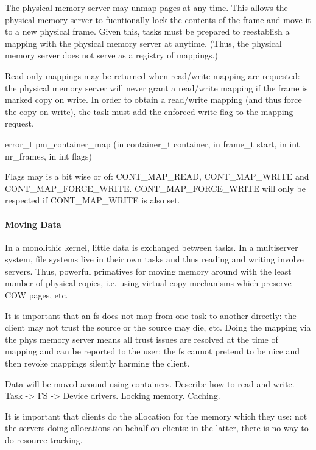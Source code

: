 The physical memory server may unmap pages at any time.  This allows
the physical memory server to fucntionally lock the contents of the
frame and move it to a new physical frame.  Given this, tasks must be
prepared to reestablish a mapping with the physical memory server at
anytime.  (Thus, the physical memory server does not serve as a
registry of mappings.)

Read-only mappings may be returned when read/write mapping are
requested: the physical memory server will never grant a read/write
mapping if the frame is marked copy on write.  In order to obtain a
read/write mapping (and thus force the copy on write), the task must
add the enforced write flag to the mapping request.

\begin{code}
error\_t pm\_container\_map (in container\_t container, in frame\_t
start, in int nr\_frames, in int flags)
\end{code}

\noindent
Flags may is a bit wise or of: CONT\_MAP\_READ, CONT\_MAP\_WRITE and
CONT\_MAP\_FORCE\_WRITE.  CONT\_MAP\_FORCE\_WRITE will only be
respected if CONT\_MAP\_WRITE is also set.

\paragraph{Moving Data}

In a monolithic kernel, little data is exchanged between tasks.  In a
multiserver system, file systems live in their own tasks and thus
reading and writing involve servers.  Thus, powerful primatives for
moving memory around with the least number of physical copies,
i.e. using virtual copy mechanisms which preserve COW pages, etc.

It is important that an fs does not map from one task to another
directly: the client may not trust the source or the source may die,
etc.  Doing the mapping via the phys memory server means all trust
issues are resolved at the time of mapping and can be reported to the
user: the fs cannot pretend to be nice and then revoke mappings
silently harming the client.

Data will be moved around using containers.  Describe how to read and
write.  Task -> FS -> Device drivers.  Locking memory.  Caching.

It is important that clients do the allocation for the memory which
they use: not the servers doing allocations on behalf on clients: in
the latter, there is no way to do resource tracking.

